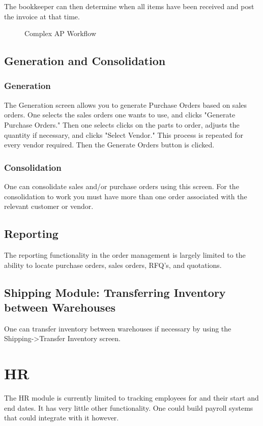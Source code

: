\documentclass{article}
\begin{document}
The bookkeeper can then determine when all items have been received and post the
invoice at that time.

\begin{figure}[hbtp]
\caption{Complex AP Workflow}

\end{figure}

\subsection{Generation and Consolidation}
\subsubsection{Generation}
The Generation screen allows you to generate Purchase Orders based on sales
orders. One selects the sales orders one wants to use, and clicks "Generate
Purchase Orders."  Then one selects clicks on the parts to order, adjusts the
quantity if necessary, and clicks "Select Vendor."   This process is repeated
for every vendor required.  Then the Generate Orders button is clicked.

\subsubsection{Consolidation}
One can consolidate sales and/or purchase orders using this screen.  For the
consolidation to work you must have more than one order associated with the
relevant customer or vendor.

\subsection{Reporting}
The reporting functionality in the order management is largely limited to the
ability to locate purchase orders, sales orders, RFQ's, and quotations.

\subsection{Shipping Module: Transferring Inventory between Warehouses}
One can transfer inventory between warehouses if necessary by using the
Shipping-\textgreater Transfer Inventory screen.

\section{HR}
The HR module is currently limited to tracking employees for and their start and
end dates.  It has very little other functionality.  One could build payroll
systems that could integrate with it however.
\end{document}
